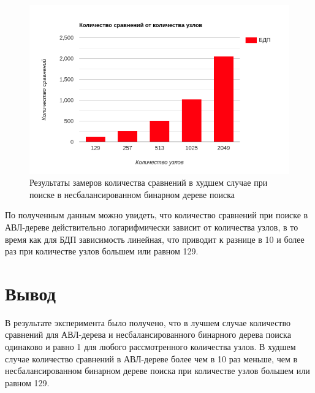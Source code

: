 \begin{figure}[h]
	\centering
	\includegraphics[height=0.4\textheight]{img/bst-graph.png}
	\caption{Результаты замеров количества сравнений в худшем случае при поиске в несбалансированном бинарном дереве поиска}
	\label{fig:bst-res}
\end{figure}

По полученным данным можно увидеть, что количество сравнений при поиске в АВЛ-дереве действительно логарифмически зависит от количества узлов, в то время как для БДП зависимость линейная, что приводит к разнице в 10 и более раз при количестве узлов большем или равном 129.

\section*{Вывод}

В результате эксперимента было получено, что в лучшем случае количество сравнений для АВЛ-дерева и несбалансированного бинарного дерева поиска одинаково и равно 1 для любого рассмотренного количества узлов.
В худшем случае количество сравнений в АВЛ-дереве более чем в 10 раз меньше, чем в несбалансированном бинарном дереве поиска при количестве узлов большем или равном 129.
